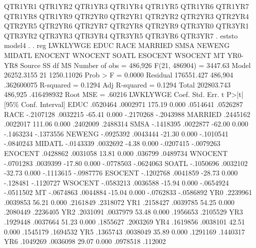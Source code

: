                QTR1YR1 QTR1YR2 QTR1YR3 QTR1YR4 QTR1YR5 QTR1YR6 QTR1YR7
               QTR1YR8 QTR1YR9 QTR2YR0 QTR2YR1 QTR2YR2 QTR2YR3 QTR2YR4
               QTR2YR5 QTR2YR6 QTR2YR7 QTR2YR8 QTR2YR9 QTR3YR0 QTR3YR1
               QTR3YR2 QTR3YR3 QTR3YR4 QTR3YR5 QTR3YR6 QTR3YR7
{\smallskip}
. eststo model4
{\smallskip}
. 
. reg  LWKLYWGE EDUC  RACE MARRIED SMSA NEWENG MIDATL ENOCENT WNOCENT SOATL ESOCENT WSOCENT MT YR0-YR8  
{\smallskip}
      Source {\VBAR}       SS           df       MS      Number of obs   =   486,926
   F(21, 486904)   =   3447.63
       Model {\VBAR}  26252.3155        21  1250.11026   Prob > F        =    0.0000
    Residual {\VBAR}  176551.427   486,904  .362600075   R-squared       =    0.1294
   Adj R-squared   =    0.1294
       Total {\VBAR}  202803.743   486,925  .416498932   Root MSE        =    .60216
{\smallskip}
    LWKLYWGE {\VBAR}      Coef.   Std. Err.      t    P>|t|     [95\% Conf. Interval]
        EDUC {\VBAR}   .0520464   .0002971   175.19   0.000     .0514641    .0526287
        RACE {\VBAR}  -.2107128   .0032215   -65.41   0.000    -.2170268   -.2043988
     MARRIED {\VBAR}   .2445162   .0022017   111.06   0.000     .2402009    .2488314
        SMSA {\VBAR}  -.1418395   .0022877   -62.00   0.000    -.1463234   -.1373556
      NEWENG {\VBAR}  -.0925392   .0043444   -21.30   0.000    -.1010541   -.0840243
      MIDATL {\VBAR}  -.0143339   .0032692    -4.38   0.000    -.0207415   -.0079263
     ENOCENT {\VBAR}   .0428862   .0031058    13.81   0.000      .036799    .0489734
     WNOCENT {\VBAR}  -.0701283   .0039399   -17.80   0.000    -.0778503   -.0624063
       SOATL {\VBAR}  -.1050696   .0032102   -32.73   0.000    -.1113615   -.0987776
     ESOCENT {\VBAR}  -.1202768   .0041859   -28.73   0.000     -.128481   -.1120727
     WSOCENT {\VBAR}  -.0583213   .0036588   -15.94   0.000    -.0654924   -.0511502
          MT {\VBAR}  -.0674863   .0044884   -15.04   0.000    -.0762833   -.0586892
         YR0 {\VBAR}   .2239961   .0039853    56.21   0.000     .2161849    .2318072
         YR1 {\VBAR}   .2158427   .0039785    54.25   0.000     .2080449    .2236405
         YR2 {\VBAR}   .2031091   .0037979    53.48   0.000     .1956653    .2105529
         YR3 {\VBAR}   .1929448   .0037664    51.23   0.000     .1855627    .2003269
         YR4 {\VBAR}   .1619856   .0038101    42.51   0.000     .1545179    .1694532
         YR5 {\VBAR}   .1365743   .0038049    35.89   0.000     .1291169    .1440317
         YR6 {\VBAR}   .1049269   .0036098    29.07   0.000     .0978518     .112002
